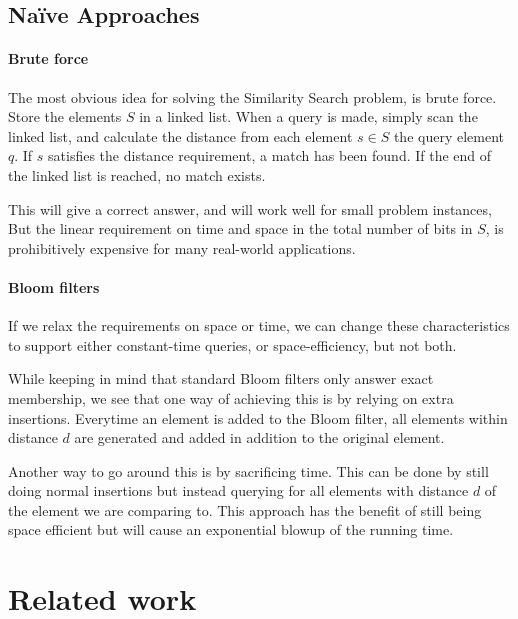 \documentclass[a4paper,11pt]{article}
\begin{document}
\subsection{Naïve Approaches}
\label{naive_approaches}

\paragraph{Brute force}
The most obvious idea for solving the Similarity Search problem, is brute force. Store the elements $S$ in a linked list. When a query is made, simply scan the linked list, and calculate the distance from each element $s \in S$ the query element $q$. If $s$ satisfies the distance requirement, a match has been found. If the end of the linked list is reached, no match exists.

This will give a correct answer, and will work well for small problem instances, But the linear requirement on time and space in the total number of bits in $S$, is prohibitively expensive for many real-world applications. 

\paragraph{Bloom filters} If we relax the requirements on space or time, we can change these characteristics to support either constant-time queries, or space-efficiency, but not both.

While keeping in mind that standard Bloom filters only answer exact membership, we see that one way of achieving this is by relying on extra insertions. Everytime an element is added to the Bloom filter, all elements within distance $d$ are generated and added in addition to the original element.

Another way to go around this is by sacrificing time. This can be done by still doing normal insertions but instead querying for all elements with distance $d$ of the element we are comparing to. This approach has the benefit of still being space efficient but will cause an exponential blowup of the running time.





\section{Related work} %
\end{document}
